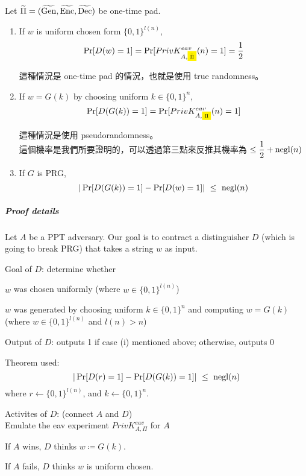 Let \(\widetilde{\Pi} = (\widetilde{\operatorname{Gen}}, \widetilde{\operatorname{Enc}}, \widetilde{\operatorname{Dec}})\) be one-time pad.

\begin{enumerate}[itemsep=10pt]
	\item If \(w\) is uniform chosen form \(\{0, 1\}^{l(n)}\),		
		\begingroup
		\setlength{\fboxsep}{1pt}
		\[ \Pr[D(w) = 1] = \Pr[PrivK_{A, \colorbox{yellow}{\scalebox{0.6}{\(\widetilde{\Pi}\)}}}^{eav}(n) = 1]
							= \frac{1}{2}\]
		\endgroup
		
		這種情況是 one-time pad 的情況，也就是使用 true randomness。
		
	\item If \(w = G(k)\) by choosing uniform \(k \in \{0, 1\}^n\),
		\begingroup
		\setlength{\fboxsep}{1pt}
		\[ \Pr[D(G(k)) = 1] = \Pr[PrivK_{A, 
		\colorbox{yellow}{\scalebox{0.6}{\(\Pi\)}}}^{eav}(n) = 1]\]
		\endgroup
		
		這種情況是使用 pseudorandomness。 \\
		這個機率是我們所要證明的，可以透過第三點來反推其機率為 \(\leq \displaystyle\frac{1}{2} + \operatorname{negl}(n)\)
		
	\item If \(G\) is PRG,
		\[ | \Pr[D(G(k)) = 1] - \Pr[D(w) = 1] | \ \leq \ \operatorname{negl}(n)\]
\end{enumerate}

\subparagraph{Proof details}

Let \(A\) be a PPT adversary. Our goal is to contract a distinguisher \(D\) (which is going to break PRG) that takes a string \(w\) as input.

Goal of \(D\): determine whether
\begin{myEnumerate}[label=(\roman*)]
	\item \(w\) was chosen uniformly (where \(w \in \{0, 1\}^{l(n)}\))
	\item \(w\) was generated by choosing uniform \(k \in \{0, 1\}^n\) and computing \(w = G(k)\) (where \(w \in \{0, 1\}^{l(n)}\) and \(l(n) > n\))
\end{myEnumerate}

Output of \(D\): outputs 1 if case (i) mentioned above; otherwise, outputs 0

Theorem used:
\[ | \Pr[D(r) = 1] - \Pr[D(G(k)) = 1] | \ \leq \ \operatorname{negl}(n)\]
where \(r \leftarrow \{0, 1\}^{l(n)}\), and \(k \leftarrow \{0, 1\}^n\).

Activites of \(D\): (connect \(A\) and \(D\)) \\
Emulate the eav experiment \(PrivK_{A, \Pi}^{eav}\) for \(A\)
\begin{myItemize}[label=—]
	\item If \(A\) wins, \(D\) thinks \(w \coloneq G(k)\).
	\item If \(A\) fails, \(D\) thinks \(w\) is uniform chosen.
\end{myItemize}

